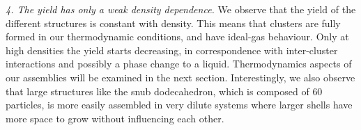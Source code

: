 \documentclass[a4paper, amsfonts, amssymb, amsmath, reprint, showkeys, nofootinbib, oneside]{revtex4-1}
\begin{document}

\noindent
\emph{4. The yield has only a weak density dependence.} We observe that the yield of the different structures is constant with density. This means that clusters are fully formed in our thermodynamic conditions, and have ideal-gas behaviour. Only at high densities the yield starts decreasing, in correspondence with inter-cluster interactions and possibly a phase change to a liquid. Thermodynamics aspects of our assemblies will be examined in the next section. Interestingly, we also observe that large structures like the snub dodecahedron, which is composed of $60$ particles, is more easily assembled in very dilute systems where larger shells have more space to grow without influencing each other.
\end{document}

